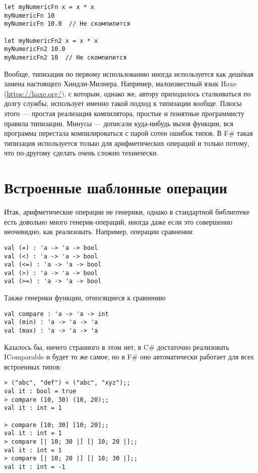 \documentclass[a5paper]{article}
\begin{document}
\begin{verbatim}
let myNumericFn x = x * x
myNumericFn 10
myNumericFn 10.0  // Не скомпилится

let myNumericFn2 x = x * x
myNumericFn2 10.0
myNumericFn2 10  // Не скомпилится
\end{verbatim}

Вообще, типизация по первому использованию иногда используется как дешёвая замена настоящего Хиндли-Милнера. Например, малоизвестный язык Haxe (\url{https://haxe.org/}), с которым, однако же, автору приходилось сталкиваться по долгу службы, использует именно такой подход к типизации вообще. Плюсы этого --- простая реализация компилятора, простые и понятные программисту правила типизации. Минусы --- дописали куда-нибудь вызов функции, вся программа перестала компилироваться с парой сотен ошибок типов. В F\# такая типизация используется только для арифметических операций и только потому, что по-другому сделать очень сложно технически.

\section{Встроенные шаблонные операции}

Итак, арифметические операции не генерики, однако в стандартной библиотеке есть довольно много генерик-операций, иногда даже если это совершенно неочевидно, как реализовать. Например, операции сравнения:

\begin{verbatim}
val (=) : 'a -> 'a -> bool
val (<) : 'a -> 'a -> bool
val (<=) : 'a -> 'a -> bool
val (>) : 'a -> 'a -> bool
val (>=) : 'a -> 'a -> bool
\end{verbatim}

Также генерики функции, относящиеся к сравнению

\begin{verbatim}
val compare : 'a -> 'a -> int
val (min) : 'a -> 'a -> 'a
val (max) : 'a -> 'a -> 'a
\end{verbatim}

Казалось бы, ничего странного в этом нет, в C\# достаточно реализовать IComparable и будет то же самое, но в F\# оно автоматически работает для всех встроенных типов:

\begin{verbatim}
> ("abc", "def") < ("abc", "xyz");;
val it : bool = true
> compare (10, 30) (10, 20);;
val it : int = 1

> compare [10; 30] [10; 20];;
val it : int = 1
> compare [| 10; 30 |] [| 10; 20 |];;
val it : int = 1
> compare [| 10; 20 |] [| 10; 30 |];;
val it : int = -1
\end{verbatim}
\end{document}
